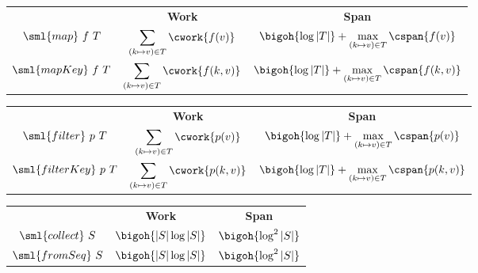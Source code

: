 \begin{cluster}
\label{grp:cst:treap-table::map}

\begin{costspec}[Map]
\label{cst:treap-table::map}
\begin{tabular}{c|c|c}
& \textbf{Work} & \textbf{Span} \\
$\sml{map}~f~T$ &
$\displaystyle\sum_{(k \mapsto v) \in T} \cwork {f(v)}$ &
$\bigoh{\log|T|} + \displaystyle\max_{(k \mapsto v) \in T} \cspan{f(v)}$
\\
$\sml{mapKey}~f~T$ &
$\displaystyle\sum_{(k \mapsto v) \in T} \cwork {f(k,v)}$ &
$\bigoh{\log|T|} + \displaystyle\max_{(k \mapsto v) \in T} \cspan{f(k,v)}$
\end{tabular}

\end{costspec}
\end{cluster}

\begin{cluster}
\label{grp:cst:treap-table::filter}

\begin{costspec}[Filter]
\label{cst:treap-table::filter}
\begin{tabular}{c|c|c}
& \textbf{Work} & \textbf{Span} \\
$\sml{filter}~p~T$ &
$\displaystyle\sum_{(k \mapsto v) \in T} \cwork {p(v)}$ &
$\bigoh{\log|T|} + \displaystyle\max_{(k \mapsto v) \in T} \cspan{p(v)}$
\\
$\sml{filterKey}~p~T$ &
$\displaystyle\sum_{(k \mapsto v) \in T} \cwork {p(k,v)}$ &
$\bigoh{\log|T|} + \displaystyle\max_{(k \mapsto v) \in T} \cspan{p(k,v)}$
\end{tabular}

\end{costspec}
\end{cluster}

\begin{cluster}
\label{grp:cst:treap-table::tables-from-sequences}

\begin{costspec}
\label{cst:treap-table::tables-from-sequences}
\begin{tabular}{c|c|c}
& \textbf{Work} & \textbf{Span} \\
$\sml{collect}~S$ & $\bigoh{|S|\log|S|}$ & $\bigoh{\log^2|S|}$ \\
$\sml{fromSeq}~S$ & $\bigoh{|S|\log|S|}$ & $\bigoh{\log^2|S|}$
\end{tabular}

\end{costspec}
\end{cluster}

